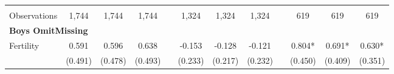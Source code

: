 \begin{landscape}
\begin{table}[htpb!]
\begin{center}
\begin{tabular}{lcccp{2mm}cccp{2mm}ccc}
\begin{footnotesize}\end{footnotesize}&\begin{footnotesize}\end{footnotesize}&\begin{footnotesize}\end{footnotesize}&\begin{footnotesize}\end{footnotesize}&\begin{footnotesize}\end{footnotesize}&\begin{footnotesize}\end{footnotesize}&\begin{footnotesize}\end{footnotesize}&\begin{footnotesize}\end{footnotesize}&\begin{footnotesize}\end{footnotesize}&\begin{footnotesize}\end{footnotesize}&\begin{footnotesize}\end{footnotesize}&\begin{footnotesize}\end{footnotesize}\\Observations&1,744&1,744&1,744&&1,324&1,324&1,324&&619&619&619\\
\multicolumn{12}{l}{\textbf{Boys OmitMissing}}\\ 
Fertility&0.591&0.596&0.638&&-0.153&-0.128&-0.121&&0.804*&0.691*&0.630*\\
&(0.491)&(0.478)&(0.493)&&(0.233)&(0.217)&(0.232)&&(0.450)&(0.409)&(0.351)\\

\end{tabular}
\end{center}
\end{table}
\end{landscape}
